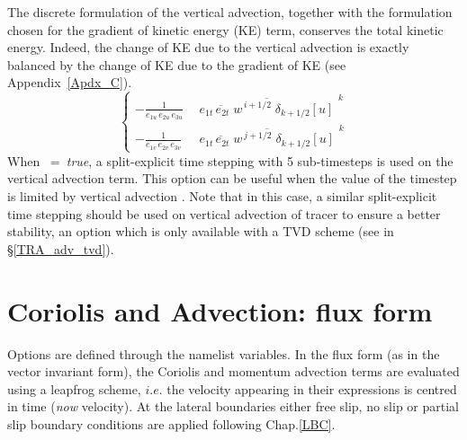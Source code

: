\documentclass[NEMO_book]{subfiles}
\begin{document}
The discrete formulation of the vertical advection, together with the formulation 
chosen for the gradient of kinetic energy (KE) term, conserves the total kinetic 
energy. Indeed, the change of KE due to the vertical advection is exactly 
balanced by the change of KE due to the gradient of KE (see Appendix~\ref{Apdx_C}).
\begin{equation} \label{Eq_dynzad}
\left\{ 		\begin{aligned}
-\frac{1} {e_{1u}\,e_{2u}\,e_{3u}} &\ \overline{\ \overline{ e_{1t}\,e_{2t}\;w } ^{\,i+1/2}  \;\delta _{k+1/2} \left[ u \right]\  }^{\,k}  \\
-\frac{1} {e_{1v}\,e_{2v}\,e_{3v}}  &\ \overline{\ \overline{ e_{1t}\,e_{2t}\;w } ^{\,j+1/2}  \;\delta _{k+1/2} \left[ u \right]\  }^{\,k} 
\end{aligned}         \right.
\end{equation} 
When ~=~\textit{true}, a split-explicit time stepping with 5 sub-timesteps is used 
on the vertical advection term.
This option can be useful when the value of the timestep is limited by vertical advection \citep{Lemarie_OM2015}. 
Note that in this case, a similar split-explicit time stepping should be used on 
vertical advection of tracer to ensure a better stability, 
an option which is only available with a TVD scheme (see  in \S\ref{TRA_adv_tvd}).


\section{Coriolis and Advection: flux form}
\label{DYN_adv_cor_flux}

Options are defined through the  namelist variables.
In the flux form (as in the vector invariant form), the Coriolis and momentum 
advection terms are evaluated using a leapfrog scheme, $i.e.$ the velocity 
appearing in their expressions is centred in time (\textit{now} velocity). At the 
lateral boundaries either free slip, no slip or partial slip boundary conditions 
are applied following Chap.\ref{LBC}.
\end{document}
